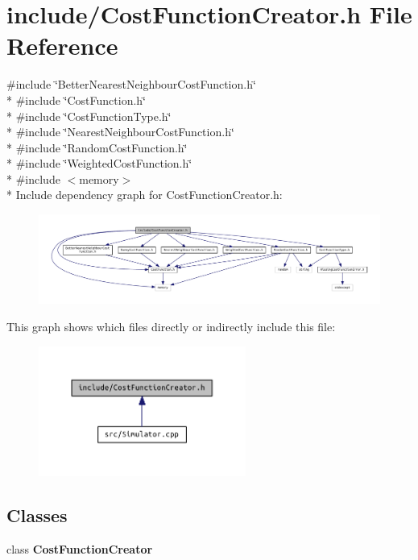 \section{include/\+Cost\+Function\+Creator.h File Reference}
\label{_cost_function_creator_8h}
{\ttfamily \#include \char`\"{}Better\+Nearest\+Neighbour\+Cost\+Function.\+h\char`\"{}}\\*
{\ttfamily \#include \char`\"{}Cost\+Function.\+h\char`\"{}}\\*
{\ttfamily \#include \char`\"{}Cost\+Function\+Type.\+h\char`\"{}}\\*
{\ttfamily \#include \char`\"{}Nearest\+Neighbour\+Cost\+Function.\+h\char`\"{}}\\*
{\ttfamily \#include \char`\"{}Random\+Cost\+Function.\+h\char`\"{}}\\*
{\ttfamily \#include \char`\"{}Weighted\+Cost\+Function.\+h\char`\"{}}\\*
{\ttfamily \#include $<$memory$>$}\\*
Include dependency graph for Cost\+Function\+Creator.\+h\+:
\nopagebreak
\begin{figure}[H]
\begin{center}
\leavevmode
\includegraphics[width=350pt]{_cost_function_creator_8h__incl}
\end{center}
\end{figure}
This graph shows which files directly or indirectly include this file\+:
\nopagebreak
\begin{figure}[H]
\begin{center}
\leavevmode
\includegraphics[width=193pt]{_cost_function_creator_8h__dep__incl}
\end{center}
\end{figure}
\subsection*{Classes}
\begin{DoxyCompactItemize}
\item 
class {\bf Cost\+Function\+Creator}
\end{DoxyCompactItemize}
